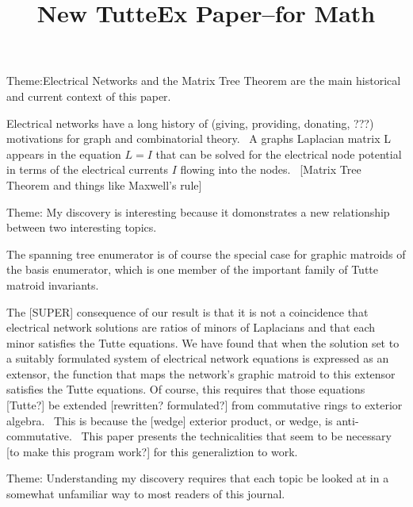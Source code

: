 \documentclass{letter}
\newenvironment{tmparmod}[3]{\begin{list}{}{\setlength{\topsep}{0pt}\setlength{\leftmargin}{#1}\setlength{\rightmargin}{#2}\setlength{\parindent}{#3}\setlength{\listparindent}{\parindent}\setlength{\itemindent}{\parindent}\setlength{\parsep}{\parskip}} \item[]}{\end{list}}
\begin{document}
\title{New TutteEx Paper--for Math }\author{}\maketitle

Theme:Electrical Networks and the Matrix Tree Theorem are the main historical
and current context of this paper.

\begin{tmparmod}{1in}{0pt}{0pt}
  \begin{tmparmod}{1cm}{0pt}{0pt}
    \begin{tmparmod}{0pt}{1cm}{0pt}
      Electrical networks have a long history of (giving, providing, donating,
      ???) motivations for graph and combinatorial theory. \ A graphs
      Laplacian matrix L appears in the equation $L  = I$ that can be solved
      for the electrical node potential  in terms of the electrical currents
      $I$ flowing into the nodes. \ [Matrix Tree Theorem and things like
      Maxwell's rule]
      
      Theme: My discovery is interesting because it domonstrates a new
      relationship between two interesting topics.
      
      The spanning tree enumerator is of course the special case for graphic
      matroids of the basis enumerator, which is one member of the important
      family of Tutte matroid invariants.
      
      The [SUPER] consequence of our result is that it is not a coincidence
      that electrical network solutions are ratios of minors of Laplacians and
      that each minor satisfies the Tutte equations. We have found that when
      the solution set to a suitably formulated system of electrical network
      equations is expressed as an extensor, the function that maps the
      network's graphic matroid to this extensor satisfies the Tutte
      equations. Of course, this requires that those equations [Tutte?] be
      extended [rewritten? formulated?] from commutative rings to exterior
      algebra. \ This is because the [wedge] exterior product, or wedge, is
      anti-commutative. \ This paper presents the technicalities that seem to
      be necessary [to make this program work?] for this generaliztion to
      work. \ 
    \end{tmparmod}
    
    Theme: Understanding my discovery requires that each topic be looked at in
    a somewhat unfamiliar way to most readers of this journal.
    

\end{tmparmod}
\end{tmparmod}
\end{document}
